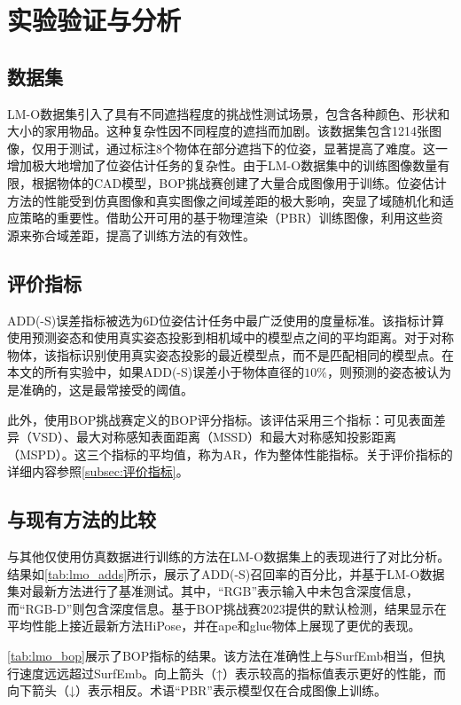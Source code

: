 \section{实验验证与分析}

\subsection{数据集}
LM-O数据集\cite{lmo}引入了具有不同遮挡程度的挑战性测试场景，包含各种颜色、形状和大小的家用物品。这种复杂性因不同程度的遮挡而加剧。该数据集包含1214张图像，仅用于测试，通过标注8个物体在部分遮挡下的位姿，显著提高了难度。这一增加极大地增加了位姿估计任务的复杂性。由于LM-O数据集中的训练图像数量有限，根据物体的CAD模型，BOP挑战赛创建了大量合成图像用于训练。位姿估计方法的性能受到仿真图像和真实图像之间域差距的极大影响，突显了域随机化和适应策略的重要性。借助公开可用的基于物理渲染（PBR）训练图像\cite{hodan2024bop}，利用这些资源来弥合域差距，提高了训练方法的有效性。

\subsection{评价指标}
ADD(-S)误差指标被选为6D位姿估计任务中最广泛使用的度量标准。该指标计算使用预测姿态和使用真实姿态投影到相机域中的模型点之间的平均距离。对于对称物体，该指标识别使用真实姿态投影的最近模型点，而不是匹配相同的模型点。在本文的所有实验中，如果ADD(-S)误差小于物体直径的$10\%$，则预测的姿态被认为是准确的，这是最常接受的阈值。

此外，使用BOP挑战赛定义的BOP评分指标\cite{hodan2024bop}。该评估采用三个指标：可见表面差异（VSD）、最大对称感知表面距离（MSSD）和最大对称感知投影距离（MSPD）。这三个指标的平均值，称为AR，作为整体性能指标。关于评价指标的详细内容参照\autoref{subsec:评价指标}。

\subsection{与现有方法的比较}

与其他仅使用仿真数据进行训练的方法在LM-O数据集\cite{lmo}上的表现进行了对比分析。结果如\autoref{tab:lmo_adds}所示，展示了ADD(-S)召回率的百分比，并基于LM-O数据集对最新方法进行了基准测试。其中，“RGB”表示输入中未包含深度信息，而“RGB-D”则包含深度信息。基于BOP挑战赛2023\cite{hodan2024bop}提供的默认检测，结果显示在平均性能上接近最新方法HiPose，并在ape和glue物体上展现了更优的表现。



\autoref{tab:lmo_bop}展示了BOP指标的结果。该方法在准确性上与SurfEmb\cite{haugaard2022surfemb}相当，但执行速度远远超过SurfEmb。向上箭头（↑）表示较高的指标值表示更好的性能，而向下箭头（↓）表示相反。术语“PBR”表示模型仅在合成图像上训练。

